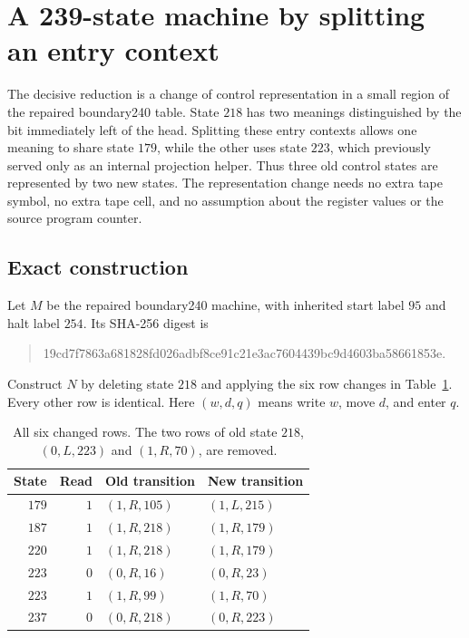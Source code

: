 \section{A 239-state machine by splitting an entry context}
\label{sec:fold239}

The decisive reduction is a change of control representation in a small
region of the repaired boundary240 table.  State $218$ has two meanings
distinguished by the bit immediately left of the head.  Splitting these
entry contexts allows one meaning to share state $179$, while the other
uses state $223$, which previously served only as an internal projection
helper.  Thus three old control states are represented by two new states.
The representation change needs no extra tape symbol, no extra tape cell,
and no assumption about the register values or the source program counter.

\subsection{Exact construction}

Let $M$ be the repaired boundary240 machine, with inherited start label
$95$ and halt label $254$.  Its SHA-256 digest is
\begin{quote}\small\ttfamily
19cd7f7863a681828fd026adbf8ce91c21e3ac7604439bc9d4603ba58661853e.
\end{quote}
Construct $N$ by deleting state $218$ and applying the six row changes
in Table~\ref{tab:239-edits}.  Every other row is identical.  Here
$(w,d,q)$ means write $w$, move $d$, and enter $q$.

\begin{table}[htbp]
\centering
\begin{tabular}{rrll}
State & Read & Old transition & New transition \\
\hline
$179$ & $1$ & $(1,R,105)$ & $(1,L,215)$ \\
$187$ & $1$ & $(1,R,218)$ & $(1,R,179)$ \\
$220$ & $1$ & $(1,R,218)$ & $(1,R,179)$ \\
$223$ & $0$ & $(0,R,16)$ & $(0,R,23)$ \\
$223$ & $1$ & $(1,R,99)$ & $(1,R,70)$ \\
$237$ & $0$ & $(0,R,218)$ & $(0,R,223)$ \\
\hline
\end{tabular}
\caption{All six changed rows.  The two rows of old state $218$,
$(0,L,223)$ and $(1,R,70)$, are removed.}
\label{tab:239-edits}
\end{table}

